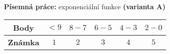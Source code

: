 \begin{center}
\large \textbf{Písemná práce:} exponenciální funkce \textbf{(varianta A)}

\normalsize
{}\qquad
{}\qquad
{}
\end{center}
\begin{table}[h]
\centering
\begin{tabular}{c|c|c|c|c|c}
    \textbf{Body}   & $< 9$ & $8-7$ & $6-5$ & $4-3$ & $2-0$ \\ \hline
    \textbf{Známka} & $1$     & $2$   & $3 $  & $4$   & $5$
\end{tabular}
\end{table}

\noindent
